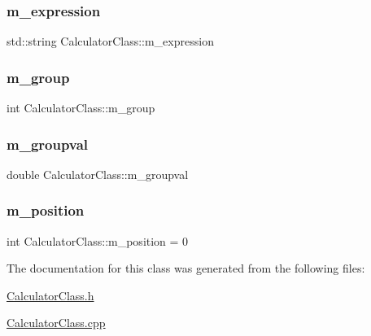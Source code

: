 \subsubsection{\texorpdfstring{m\+\_\+expression}{m\_expression}}
{\footnotesize\ttfamily std\+::string Calculator\+Class\+::m\+\_\+expression\hspace{0.3cm}{\ttfamily [private]}}

\mbox{\label{class_calculator_class_aaf297978d3d340d012e118c39671ee3d}} 
\subsubsection{\texorpdfstring{m\+\_\+group}{m\_group}}
{\footnotesize\ttfamily int Calculator\+Class\+::m\+\_\+group\hspace{0.3cm}{\ttfamily [private]}}

\mbox{\label{class_calculator_class_af0634375d7137106773bc6a06a69ae49}} 
\subsubsection{\texorpdfstring{m\+\_\+groupval}{m\_groupval}}
{\footnotesize\ttfamily double Calculator\+Class\+::m\+\_\+groupval\hspace{0.3cm}{\ttfamily [private]}}

\mbox{\label{class_calculator_class_a06e41f94f4b3c9f6452ea34041100adf}} 
\subsubsection{\texorpdfstring{m\+\_\+position}{m\_position}}
{\footnotesize\ttfamily int Calculator\+Class\+::m\+\_\+position = 0\hspace{0.3cm}{\ttfamily [private]}}



The documentation for this class was generated from the following files\+:\begin{DoxyCompactItemize}
\item 
\hyperlink{_calculator_class_8h}{Calculator\+Class.\+h}\item 
\hyperlink{_calculator_class_8cpp}{Calculator\+Class.\+cpp}\end{DoxyCompactItemize}
